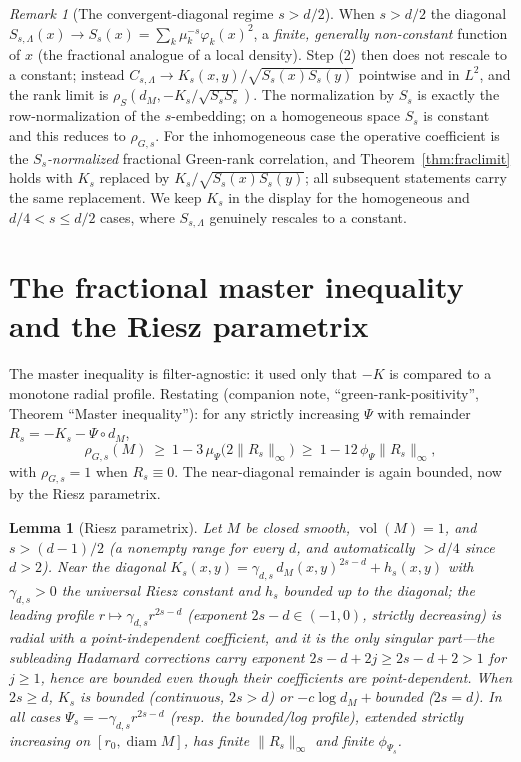 \documentclass[11pt]{article}
\newtheorem{lemma}[theorem]{Lemma}
\theoremstyle{remark}
\newtheorem{remark}[theorem]{Remark}
\newcommand{\vol}{\operatorname{vol}}
\newcommand{\diam}{\operatorname{diam}}
\newcommand{\dM}{d_M}
\newcommand{\Rem}{R}
\begin{document}
\begin{remark}[The convergent-diagonal regime $s>d/2$]
When $s>d/2$ the diagonal $S_{s,\Lambda}(x)\to S_s(x)=\sum_k\mu_k^{-s}\varphi_k(x)^2$, a
\emph{finite, generally non-constant} function of $x$ (the fractional analogue of a local
density). Step (2) then does not rescale to a constant; instead $C_{s,\Lambda}\to
K_s(x,y)/\sqrt{S_s(x)S_s(y)}$ pointwise and in $L^2$, and the rank limit is
$\rho_S(\dM,-K_s/\sqrt{S_sS_s})$. The normalization by $S_s$ is exactly the row-normalization
of the $s$-embedding; on a homogeneous space $S_s$ is constant and this reduces to
$\rho_{G,s}$. For the inhomogeneous case the operative coefficient is the
\emph{$S_s$-normalized} fractional Green-rank correlation, and Theorem~\ref{thm:fraclimit}
holds with $K_s$ replaced by $K_s/\sqrt{S_s(x)S_s(y)}$; all subsequent statements carry the
same replacement. We keep $K_s$ in the display for the homogeneous and $d/4<s\le d/2$ cases,
where $S_{s,\Lambda}$ genuinely rescales to a constant.
\end{remark}

\section{The fractional master inequality and the Riesz parametrix}

The master inequality is filter-agnostic: it used only that $-K$ is compared to a monotone
radial profile. Restating (companion note, ``green-rank-positivity'', Theorem ``Master
inequality''): for any strictly increasing $\Psi$ with remainder
$\Rem_s=-K_s-\Psi\circ\dM$,
\[
\rho_{G,s}(M)\ \ge\ 1-3\,\mu_\Psi\!\bigl(2\lVert\Rem_s\rVert_\infty\bigr)\ \ge\
1-12\,\phi_\Psi\lVert\Rem_s\rVert_\infty,
\]
with $\rho_{G,s}=1$ when $\Rem_s\equiv0$. The near-diagonal remainder is again bounded, now
by the Riesz parametrix.

\begin{lemma}[Riesz parametrix]\label{lem:riesz}
Let $M$ be closed smooth, $\vol(M)=1$, and $s>(d-1)/2$ (a nonempty range for every $d$, and
automatically $>d/4$ since $d>2$). Near the diagonal
$K_s(x,y)=\gamma_{d,s}\,\dM(x,y)^{2s-d}+h_s(x,y)$ with $\gamma_{d,s}>0$ the universal Riesz
constant and $h_s$ bounded up to the diagonal; the leading profile
$r\mapsto\gamma_{d,s}r^{2s-d}$ (exponent $2s-d\in(-1,0)$, strictly decreasing) is radial with a
point-independent coefficient, and it is the \emph{only} singular part---the subleading
Hadamard corrections carry exponent $2s-d+2j\ge2s-d+2>1$ for $j\ge1$, hence are bounded even
though their coefficients are point-dependent. When $2s\ge d$, $K_s$ is bounded (continuous,
$2s>d$) or $-c\log\dM+$bounded ($2s=d$). In all cases $\Psi_s=-\gamma_{d,s}r^{2s-d}$ (resp.\
the bounded/log profile), extended strictly increasing on $[r_0,\diam M]$, has finite
$\lVert\Rem_{s}\rVert_\infty$ and finite $\phi_{\Psi_s}$.
\end{lemma}
\end{document}
